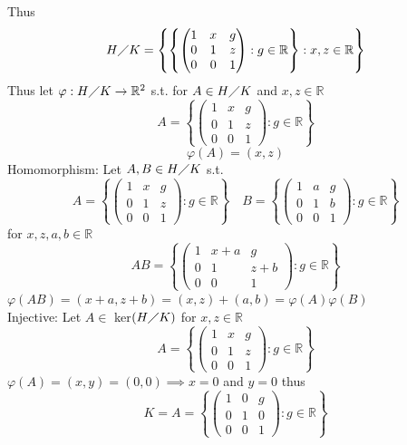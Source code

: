 \documentclass[12pt, letterpaper]{article}
\theoremstyle{definition}
\newcommand{\R}{\mathbb{R}}
\begin{document}
    Thus
    \[
    H \diagup K = \left\{ \left\{\begin{pmatrix}
        1 & x & g \\
        0 & 1 & z \\
        0 & 0 & 1
        \end{pmatrix}  : g \in \mathbb{R} \right\}  : x,z \in \mathbb{R} \right\}
    \]
    Thus let $\varphi : H \diagup K \rightarrow \R^2$ s.t. for $A \in H \diagup K$ and $x,z \in \R$
    \[
    A = \left\{ 
        \begin{pmatrix}
        1 & x & g \\
        0 & 1 & z \\
        0 & 0 & 1
        \end{pmatrix}  : g \in \mathbb{R} \right\}
    \]
    \[\varphi(A)=(x,z)\]
    Homomorphism: Let $A,B \in H \diagup K$ s.t.
    \[
    A = \left\{ 
        \begin{pmatrix}
        1 & x & g \\
        0 & 1 & z \\
        0 & 0 & 1
        \end{pmatrix}  : g \in \mathbb{R} \right\} \quad B = \left\{ 
        \begin{pmatrix}
        1 & a & g \\
        0 & 1 & b \\
        0 & 0 & 1
        \end{pmatrix}  : g \in \mathbb{R} \right\}
    \]
    for $x,z,a,b \in \R$
    \[
    AB = \left\{ 
        \begin{pmatrix}
        1 & x+a & g \\
        0 & 1 & z+b \\
        0 & 0 & 1
        \end{pmatrix}  : g \in \mathbb{R} \right\}
    \]
    $\varphi(AB)=(x+a,z+b)=(x,z)+(a,b)=\varphi(A)\varphi(B)$\\
    Injective: Let $A \in$ ker$(H \diagup K)$ for $x,z \in \R$
    \[
    A = \left\{ 
        \begin{pmatrix}
        1 & x & g \\
        0 & 1 & z \\
        0 & 0 & 1
        \end{pmatrix}  : g \in \mathbb{R} \right\}
    \]
    $\varphi(A)=(x,y)=(0,0) \implies x=0$ and $y=0$ thus
    \[
    K=A = \left\{ 
        \begin{pmatrix}
        1 & 0 & g \\
        0 & 1 & 0 \\
        0 & 0 & 1
        \end{pmatrix}  : g \in \mathbb{R} \right\}
    \]
\end{document}
